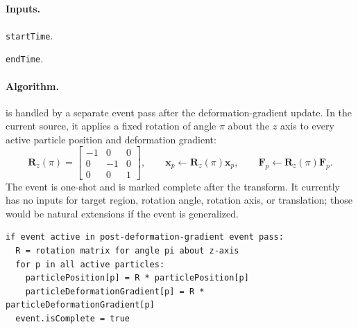 \subsection{}
\label{subsec:event-transform-particles}

\paragraph{Inputs.}
\begin{description}[leftmargin=*,style=nextline]
\item[\textbf{Required.}] \texttt{startTime}.
\item[\textbf{Optional.}] \texttt{endTime}.
\end{description}

\paragraph{Algorithm.}
 is handled by a separate event pass after the deformation-gradient update.  In the current source, it applies a fixed rotation of angle $\pi$ about the $z$ axis to every active particle position and deformation gradient:
\begin{equation}
  \mathbf{R}_z(\pi)=
  \begin{bmatrix}
  -1 & 0 & 0\\
   0 &-1 & 0\\
   0 & 0 & 1
  \end{bmatrix},
  \qquad
  \mathbf{x}_p\leftarrow\mathbf{R}_z(\pi)\mathbf{x}_p,
  \qquad
  \mathbf{F}_p\leftarrow\mathbf{R}_z(\pi)\mathbf{F}_p.
  \label{eq:transform-particles-rotation}
\end{equation}
The event is one-shot and is marked complete after the transform.  It currently has no inputs for target region, rotation angle, rotation axis, or translation; those would be natural extensions if the event is generalized.

\begin{lstlisting}[caption={TransformParticles event pseudocode.}]
if event active in post-deformation-gradient event pass:
  R = rotation matrix for angle pi about z-axis
  for p in all active particles:
    particlePosition[p] = R * particlePosition[p]
    particleDeformationGradient[p] = R * particleDeformationGradient[p]
  event.isComplete = true
\end{lstlisting}

